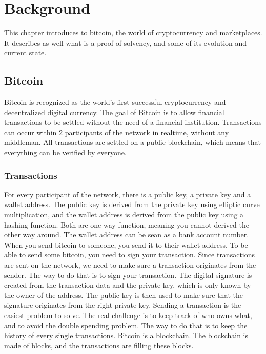
\chapter{Background}
This chapter introduces to bitcoin, the world of cryptocurrency and marketplaces. It describes as well 
what is a proof of solvency, and some of its evolution and current state.

\section{Bitcoin}

Bitcoin is recognized as the world's first successful cryptocurrency and decentralized digital currency. 
The goal of Bitcoin is to allow financial transactions to be settled without the need of a financial institution.
Transactions can occur within 2 participants of the network in realtime, without any middleman. 
All transactions are settled on a public blockchain, which means that everything can be verified by everyone. 

\subsection{Transactions}
For every participant of the network, there is a public key,  a private key and a wallet address.
The public key is derived from the private key using elliptic curve multiplication, and the wallet address is derived from the public key using a hashing function.
Both are one way function, meaning you cannot derived the other way around.
The wallet address can be sean as a bank account number. When you send bitcoin to someone, you send it to their wallet address.
To be able to send some bitcoin, you need to sign your transaction. 
Since transactions are sent on the network, we need to make sure a transaction originates from the sender.
The way to do that is to sign your transaction. The digital signature is created from the transaction data and the private key, which is only known by the owner of the address.
The public key is then used to make sure that the signature originates from the right private key.
Sending a transaction is the easiest problem to solve. The real challenge is to keep track of who owns what, and to avoid the double spending problem.
The way to do that is to keep the history of every single transactions. 
Bitcoin is a blockchain. The blockchain is made of blocks, and the transactions are filling these blocks.



